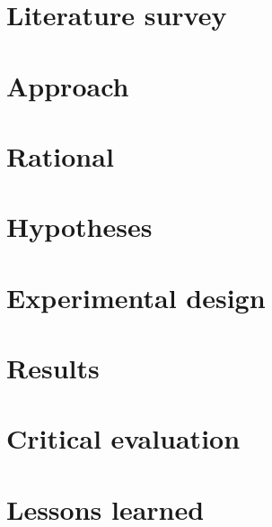 \documentclass[twoside]{article}
\begin{document}
\begin{multicols}{2}
 


\section{Literature survey}


\section{Approach}


\section{Rational}


\section{Hypotheses}


\section{Experimental design}


\section{Results}


\section{Critical evaluation}


\section{Lessons learned}



\end{multicols}
\end{document}
